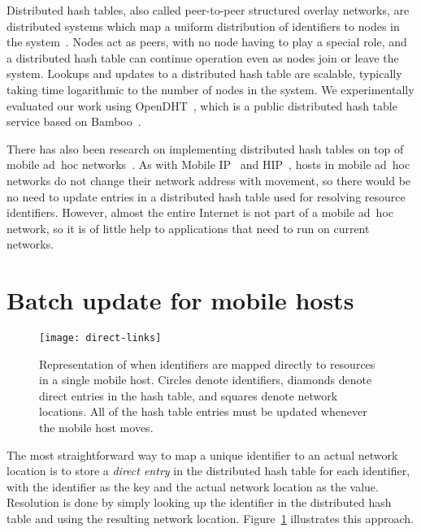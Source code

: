 \documentclass{article}
\begin{document}
Distributed hash tables, also called peer-to-peer structured overlay
networks, are distributed systems which map a uniform distribution of
identifiers to nodes in the
system~\cite{androutsellis:survey2004,stoica:ton2003,zhao:jsac2004}.
Nodes act as peers, with no node having to play a special role, and a
distributed hash table can continue operation even as nodes join or
leave the system.  Lookups and updates to a distributed hash table are
scalable, typically taking time logarithmic to the number of nodes in
the system.  We experimentally evaluated our work using
OpenDHT~\cite{rhea:sigcomm2005}, which is a public distributed hash
table service based on Bamboo~\cite{bamboo}.

There has also been research on implementing distributed hash tables
on top of mobile ad~hoc
networks~\cite{heer:percomw2006,landsiedel:mobishare2006}.  As with
Mobile IP~\cite{mobileip} and HIP~\cite{rfc4423}, hosts in mobile
ad~hoc networks do not change their network address with movement, so
there would be no need to update entries in a distributed hash table
used for resolving resource identifiers.  However, almost the entire
Internet is not part of a mobile ad~hoc network, so it is of little
help to applications that need to run on current networks.


\section{Batch update for mobile hosts}
\label{sec:batch-updates}

\begin{figure}
  \centering
  \texttt{[image: direct-links]}
  \caption{Representation of when identifiers are mapped directly to
    resources in a single mobile host.  Circles denote identifiers,
    diamonds denote direct entries in the hash table, and squares
    denote network locations.  All of the hash table entries must be
    updated whenever the mobile host moves.}
  \label{fig:direct-entries}
\end{figure}

The most straightforward way to map a unique identifier to an actual
network location is to store a \emph{direct entry} in the distributed
hash table for each identifier, with the identifier as the key and the
actual network location as the value.  Resolution is done by simply
looking up the identifier in the distributed hash table and using the
resulting network location.  Figure~\ref{fig:direct-entries}
illustrates this approach.
\end{document}
